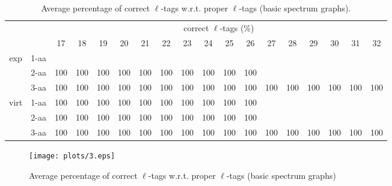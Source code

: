 \documentclass{article}
\begin{document}
\begin{landscape}
\begin{table}[h]\tiny
\vspace{3mm}
{\centering
\begin{center}
\begin{tabular}{|c|l|c|c|c|c|c|c|c|c|c|c|c|c|c|c|c|c|}
  \hline
  \multicolumn{2}{|c|}{ } & \multicolumn{ 16 }{|c|}{ correct $\ell$-tags (\%)} \\
  \cline{3- 18}
  \multicolumn{2}{|c|}{ }  & 17 & 18 & 19 & 20 & 21 & 22 & 23 & 24 & 25 & 26 & 27 & 28 & 29 & 30 & 31 & 32\\
  \hline
  \multirow{3}{*}{exp}
&  1-aa  &  &  &  &  &  &  &  &  &  &  &  &  &  &  &  & \\
&  2-aa  & 100 & 100 & 100 & 100 & 100 & 100 & 100 & 100 & 100 & 100 &  &  &  &  &  & \\
&  3-aa  & 100 & 100 & 100 & 100 & 100 & 100 & 100 & 100 & 100 & 100 & 100 & 100 & 100 & 100 & 100 & 100\\
 \hline
  \multirow{3}{*}{virt} 
&  1-aa  & 100 & 100 & 100 & 100 & 100 & 100 & 100 & 100 & 100 & 100 &  &  &  &  &  & \\
&  2-aa  & 100 & 100 & 100 & 100 & 100 & 100 & 100 & 100 & 100 & 100 &  &  &  &  &  & \\
&  3-aa  & 100 & 100 & 100 & 100 & 100 & 100 & 100 & 100 & 100 & 100 & 100 & 100 & 100 & 100 & 100 & 100\\
 \hline
\end{tabular}
\end{center}
\par}
\centering
\caption{ Average percentage of correct $\ell$-tags w.r.t. proper $\ell$-tags (basic spectrum graphs).}
\label{table:table3}
\vspace{3mm}
\end{table}

\end{landscape}

\begin{figure}
  \begin{center}
\texttt{[image: plots/3.eps]}

\end{center}
\caption{Average percentage of correct $\ell$-tags w.r.t. proper $\ell$-tags (basic spectrum graphs)}
  \label{fig:LABEL}
\end{figure}
\end{document}
